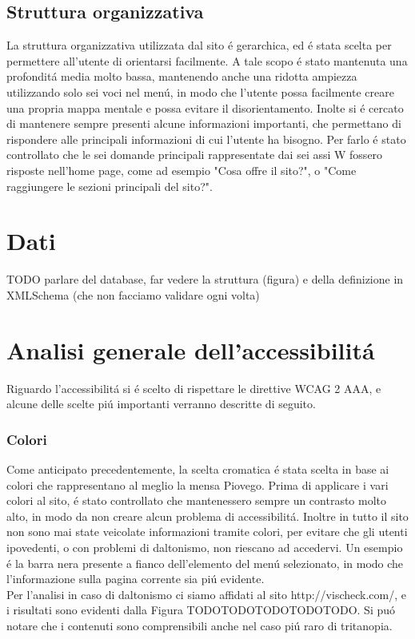 \documentclass[10pt,a4paper,onecolumn]{article}
\begin{document}
\subsection{Struttura organizzativa}

La struttura organizzativa utilizzata dal sito \'e gerarchica, ed \'e stata scelta per permettere all'utente di orientarsi facilmente. A tale scopo \'e stato mantenuta una profondit\'a media molto bassa, mantenendo anche una ridotta ampiezza utilizzando solo sei voci nel men\'u, in modo che l'utente possa facilmente creare una propria mappa mentale e possa evitare il disorientamento.
Inolte si \'e cercato di mantenere sempre presenti alcune informazioni importanti, che permettano di rispondere alle principali informazioni di cui l'utente ha bisogno. Per farlo \'e stato controllato che le sei domande principali rappresentate dai sei assi W fossero risposte nell'home page, come ad esempio "Cosa offre il sito?", o "Come raggiungere le sezioni principali del sito?".

\section{Dati}

TODO parlare del database, far vedere la struttura (figura) e della definizione in XMLSchema (che non facciamo validare ogni volta)

\section{Analisi generale dell'accessibilit\'a}

Riguardo l'accessibilit\'a si \'e scelto di rispettare le direttive WCAG 2 AAA, e alcune delle scelte pi\'u importanti verranno descritte di seguito.

\subsubsection{Colori}

Come anticipato precedentemente, la scelta cromatica \'e stata scelta in base ai colori che rappresentano al meglio la mensa Piovego. Prima di applicare i vari colori al sito, \'e stato controllato che mantenessero sempre un contrasto molto alto, in modo da non creare alcun problema di accessibilit\'a. Inoltre in tutto il sito non sono mai state veicolate informazioni tramite colori, per evitare che gli utenti ipovedenti, o con problemi di daltonismo, non riescano ad accedervi. Un esempio \'e la barra nera presente a fianco dell'elemento del men\'u selezionato, in modo che l'informazione sulla pagina corrente sia pi\'u evidente. \\
Per l'analisi in caso di daltonismo ci siamo affidati al sito http://vischeck.com/, e i risultati sono evidenti dalla Figura TODOTODOTODOTODOTODO. Si pu\'o notare che i contenuti sono comprensibili anche nel caso pi\'u raro di tritanopia.
\end{document}
